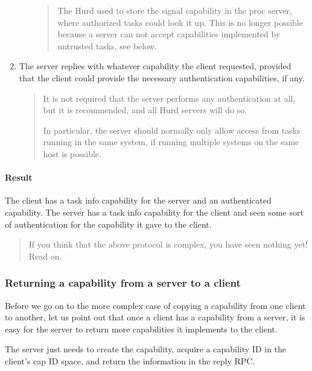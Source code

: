 \documentclass[9pt,a4paper]{extarticle}
\newenvironment{comment}{\footnotesize \begin{quote}}{\end{quote}}
\begin{document}
\begin{enumerate}
\begin{itemize}
    \begin{comment}
      The Hurd used to store the signal capability in the proc server,
      where authorized tasks could look it up.  This is no longer
      possible because a server can not accept capabilities
      implemented by untrusted tasks, see below.
    \end{comment}
  \end{itemize}
  
\item The server replies with whatever capability the client
  requested, provided that the client could provide the necessary
  authentication capabilities, if any.

  \begin{comment}
    It is not required that the server performs any authentication at
    all, but it is recommended, and all Hurd servers will do so.
    
    In particular, the server should normally only allow access from
    tasks running in the same system, if running multiple systems on
    the same host is possible.
  \end{comment}
\end{enumerate}

\paragraph{Result}
The client has a task info capability for the server and an
authenticated capability.  The server has a task info capability for
the client and seen some sort of authentication for the capability it
gave to the client.

\begin{comment}
  If you think that the above protocol is complex, you have seen
  nothing yet!  Read on.
\end{comment}


\subsubsection{Returning a capability from a server to a client}

Before we go on to the more complex case of copying a capability from
one client to another, let us point out that once a client has a
capability from a server, it is easy for the server to return more
capabilities it implements to the client.

The server just needs to create the capability, acquire a capability
ID in the client's cap ID space, and return the information in the
reply RPC.
\end{document}
